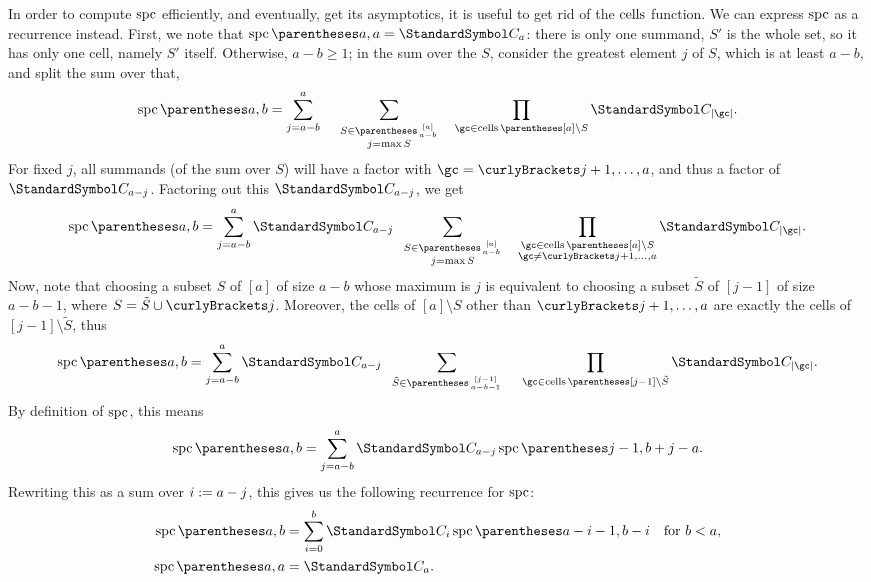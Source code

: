 In order to compute $\operatorname{spc}$ efficiently, and eventually, get its asymptotics, it is useful to get rid
of the $\operatorname{cells}$ function. We can express $\operatorname{spc}$ as a recurrence instead.
First, we note that $\spc\of{a,a} = \CatalanNumber a$: there is only one summand, $S'$ is the whole set, so
it has only one cell, namely $S'$ itself.
Otherwise, $a-b\geq 1$; in the sum over the $S$, consider the greatest element $j$ of $S$, which is at least
$a-b$, and split the sum over that,
\[\spc\of{a,b} = \sum{j=a-b}[a]\quad\;
\sum{\substack{S\in\binom{[a]}{a-b} \\ j=\max S}} \quad
\prod{\gc\in\cells\of{[a] \setminus S}}\CatalanNumber {\Cardinality \gc}\text.
\]
For fixed $j$, all summands (of the sum over $S$) will have a factor
with $\gc=\set{j+1,\dotsc,a}$, and thus a factor of
$\CatalanNumber {a-j}$. Factoring out this $\CatalanNumber {a-j}$, we get
\[\spc\of{a, b} = \sum{j=a-b}[a]
\CatalanNumber {a-j} \;\;
\sum{\substack{S\in\binom{[a]}{a-b} \\ j=\max S}} \quad
\prod{\substack{\gc\in\cells\of{[a] \setminus S} \\ \gc\neq\set{j+1,\dotsc,a}}}
    \CatalanNumber {\Cardinality \gc}\text.
\]
Now, note that choosing a subset $S$ of $[a]$ of size $a-b$ whose maximum is $j$ is equivalent to choosing
a subset $\tilde{S}$ of $[j-1]$ of size $a-b - 1$, where $S=\tilde{S}\Union\set{j}$.
Moreover, the cells of $[a]\setminus S$ other
than $\set{j+1,\dotsc,a}$ are exactly the cells of $[j-1]\setminus \tilde{S}$, thus
\[\spc\of{a,b} = \sum{j=a-b}[a]
\CatalanNumber {a-j} \;\;
\sum{\tilde{S}\in\binom{[j-1]}{a-b - 1}} \quad\;
\prod{\gc\in\cells\of{[j-1]\setminus \tilde{S}}}
    \CatalanNumber {\Cardinality \gc}\text.
\]
By definition of $\operatorname{spc}$, this means
\[\spc\of{a,b} = \sum{j=a-b}[a]
\CatalanNumber {a-j}
\spc\of{j-1,b+j-a}\text.
\]
Rewriting this as a sum over $i:= a-j$, this gives us the following recurrence for $\operatorname{spc}$:
\begin{align}\spc\of{a,b} &= \sum{i=0}[b]
\CatalanNumber {i}
\spc\of{a-i-1,b-i} &\text{for $b<a$,} \label{spcRecurrence1}\\
\spc\of{a,a} &= \CatalanNumber a \label{spckk}\text.
\end{align}
